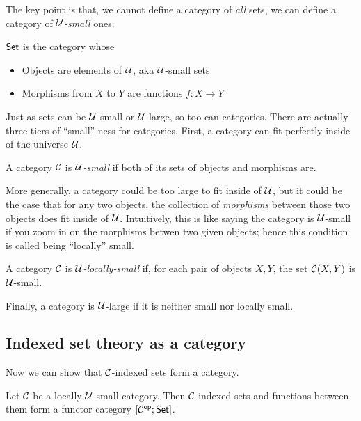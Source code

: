 The key point is that, we cannot define a category of \emph{all} sets, we  can define a category of \emph{\(\mathcal U\)-small} ones.
\begin{definition}
  \(\mathsf{Set}\) is the category whose
  \begin{itemize}
    \item Objects are elements of \(\mathcal U\), aka \(\mathcal U\)-small sets
    \item Morphisms from \(X\) to \(Y\) are functions \(f : X \to Y\)
  \end{itemize}
\end{definition}
Just as sets can be \(\mathcal U\)-small or \(\mathcal U\)-large, so too can categories.
There are actually three tiers of ``small''-ness for categories.
First, a category can fit perfectly inside of the universe \(\mathcal U\).
\begin{definition}
  A category \(\mathcal C\) is \emph{\(\mathcal U\)-small} if both of its sets of objects and morphisms are.
\end{definition}
More generally, a category could be too large to fit inside of \(\mathcal U\), but it could be the case that for any two objects,
the collection of \emph{morphisms} between those two objects does fit inside of \(\mathcal U\).
Intuitively, this is like saying the category is \(\mathcal U\)-small if you zoom in on the morphisms betwen two given objects;
hence this condition is called being ``locally'' small.
\begin{definition}
  A category \(\mathcal C\) is \emph{\(\mathcal U\)-locally-small} if, for each pair of objects \(X,Y\),
  the set \(\mathcal C(X,Y)\) is \(\mathcal U\)-small.
\end{definition}
Finally, a category is \(\mathcal U\)-large if it is neither small nor locally small.

\subsection{Indexed set theory as a category}
Now we can show that \(\mathcal C\)-indexed sets form a category.
\begin{definition}
  Let \(\mathcal C\) be a locally \(\mathcal U\)-small category.
  Then \(\mathcal C\)-indexed sets and functions between them form a functor category \([\mathcal C^{\mathsf{op}};\mathsf{Set}]\).
\end{definition}

